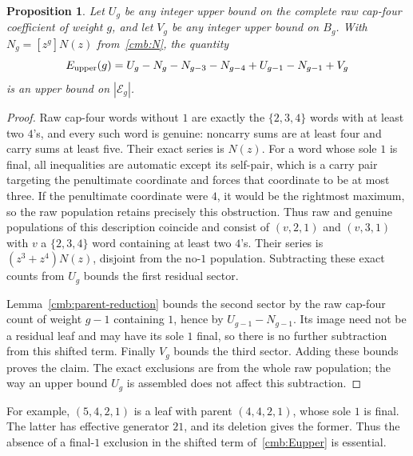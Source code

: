 \documentclass[11pt]{amsart}
\newtheorem{proposition}[theorem]{Proposition}
\theoremstyle{definition}
\theoremstyle{remark}
\numberwithin{equation}{section}
\begin{document}
\begin{proposition}\label{cmb:raw-envelope}
Let $U_g$ be any integer upper bound on the complete raw cap-four
coefficient of weight $g$, and let $V_g$ be any integer upper bound on
$B_g$. With $N_g=[z^g]N(z)$ from~\eqref{cmb:N}, the quantity
\begin{equation}\label{cmb:Eupper}
 E_{\rm upper}(g)=U_g-N_g-N_{g-3}-N_{g-4}
                         +U_{g-1}-N_{g-1}+V_g
\end{equation}
is an upper bound on $|\mathcal E_g|$.
\end{proposition}
\begin{proof}
Raw cap-four words without $1$ are exactly the $\{2,3,4\}$ words with
at least two $4$'s, and every such word is genuine: noncarry sums are at
least four and carry sums at least five. Their exact series is $N(z)$.
For a word whose sole $1$ is final, all inequalities are automatic except
its self-pair, which is a carry pair targeting the penultimate coordinate
and forces that coordinate to be at most three. If the penultimate
coordinate were $4$, it would be the rightmost maximum, so the raw
population retains precisely this obstruction. Thus raw and genuine
populations of this description coincide and consist of
$(v,2,1)$ and $(v,3,1)$ with $v$ a $\{2,3,4\}$ word containing at least
two $4$'s. Their series is $(z^3+z^4)N(z)$, disjoint from the no-$1$
population. Subtracting these exact counts from $U_g$ bounds the
first residual sector.

Lemma~\ref{cmb:parent-reduction} bounds the second sector by the
raw cap-four count of weight $g-1$ containing $1$, hence by
$U_{g-1}-N_{g-1}$. Its image need not be a residual leaf and may have its
sole $1$ final, so there is no further subtraction from this shifted term.
Finally $V_g$ bounds the third sector. Adding these bounds proves the
claim. The exact exclusions are from the whole raw population; the way an
upper bound $U_g$ is assembled does not affect this subtraction.
\end{proof}

For example, $(5,4,2,1)$ is a leaf with parent $(4,4,2,1)$, whose sole $1$
is final. The latter has effective generator $21$, and its deletion gives
the former. Thus the absence of a final-$1$ exclusion in the shifted term
of~\eqref{cmb:Eupper} is essential.
\end{document}
